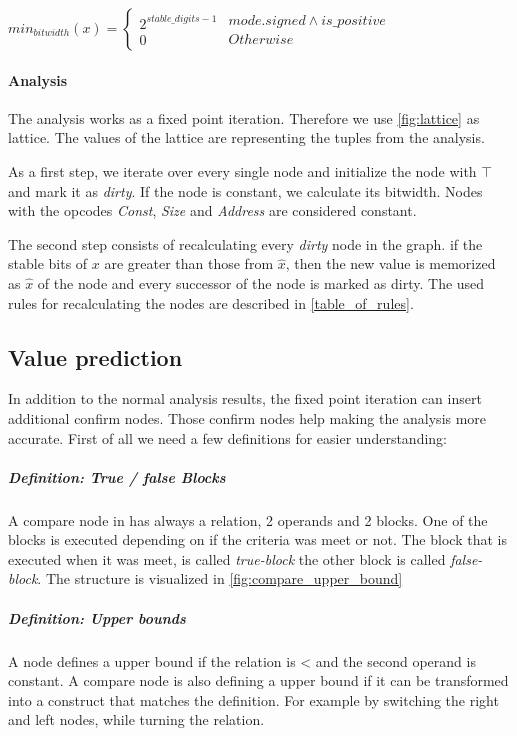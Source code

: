 $
min_{bitwidth}(x)=
\left\{
\begin{array}{l}2^{stable\_digits-1}\\0\end{array}
\begin{array}{l} {mode.signed \wedge is\_positive} \\ {Otherwise} \end{array}
\right.
$



\paragraph{Analysis} The analysis works as a fixed point iteration. Therefore we use  \autoref{fig:lattice} as lattice. The values of the lattice are representing the tuples from the analysis.

As a first step, we iterate over every single node and initialize the node with $\top$ and mark it as \textit{dirty}. If the node is constant, we calculate its bitwidth. Nodes with the opcodes \textit{Const}, \textit{Size} and \textit{Address} are considered constant.

The second step consists of recalculating every \textit{dirty} node in the graph. if the stable bits of $x$ are greater than those from $\hat{x}$, then the new value is memorized as $\hat{x}$ of the node and every successor of the node is marked as dirty. The used rules for recalculating the nodes are described in \autoref{table_of_rules}.

\subsection{Value prediction}
In addition to the normal analysis results, the fixed point iteration can insert additional 
confirm nodes. Those confirm nodes help making the analysis more accurate.
First of all we need a few definitions for easier understanding:

\subparagraph{Definition: True / false Blocks}
A compare node in \libFIRM has always a relation, 2 operands and 2 blocks. One of the blocks is executed depending on if the criteria was meet or not. The block that is executed when it was meet, is called \emph{true-block} the other block is called \emph{false-block}. The structure is visualized in \autoref{fig:compare_upper_bound}


\subparagraph{Definition: Upper bounds}
A node defines a upper bound if the relation is < and the second operand is constant.\newline
A compare node is also defining a upper bound if it can be transformed into a construct that matches the definition. For example by switching the right and left nodes, while turning the relation.

